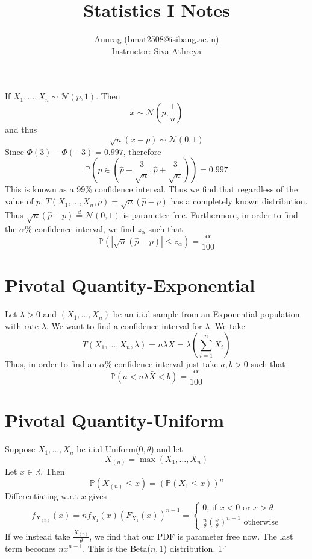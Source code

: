 \documentclass{article}
\title{Statistics I Notes}
\author{
\begin{tabular}{c}
Anurag (bmat2508@isibang.ac.in)\\[0.6em]
Instructor: Siva Athreya
\end{tabular}
}
\date{}
\begin{document}
\maketitle
If $X_1,\dots,X_n \sim \mathcal{N}(p,1)$. Then
$$\bar{x}\sim \mathcal{N}(p,\frac{1}{n})$$
and thus
$$\sqrt{n}(\bar{x}-p)\sim\mathcal{N}(0,1)$$
Since $\Phi(3)-\Phi(-3)=0.997$, therefore
$$\mathbb{P}(p\in(\hat{p}-\frac{3}{\sqrt{n}},\hat{p}+\frac{3}{\sqrt{n}}))=0.997$$
This is known as a 99\% confidence interval.
Thus we find that regardless of the value of $p$, $T(X_1,\dots,X_n,p)=\sqrt{n}(\hat{p}-p)$ has  a completely known distribution.
Thus $\sqrt{n}(\hat{p}-p)\overset{d}{=}\mathcal{N}(0,1)$ is parameter free. Furthermore, in order to find the $\alpha\%$ confidence interval, we find $z_{\alpha}$ such that
$$\mathbb{P}(|\sqrt{n}(\hat{p}-p)|\leq z_{\alpha})=\frac{\alpha}{100}$$
\section*{Pivotal Quantity-Exponential}
Let $\lambda>0$ and $(X_1,\dots,X_n)$ be an i.i.d sample from an Exponential population with rate $\lambda$. We want to find a confidence interval for $\lambda$. We take
$$T(X_1,\dots,X_n,\lambda)=n\lambda\bar{X}=\lambda \left(\sum_{i=1}^n X_i\right)$$
Thus, in order to find an $\alpha\%$ confidence interval just take $a,b>0$ such that 
$$\mathbb{P}(a<n\lambda\bar{X}<b)=\frac{\alpha}{100}$$
\section*{Pivotal Quantity-Uniform}
Suppose $X_1,\dots,X_n$  be i.i.d Uniform($0,\theta$) and let
$$X_{(n)}=\max{(X_1,\dots,X_n)}$$
 Let $x\in\mathbb{R}$. Then $$\mathbb{P}(X_{(n)}\leq x)=(\mathbb{P}(X_1\leq x))^n$$
 Differentiating w.r.t $x$ gives
 $$f_{X_{(n)}}(x)=n f_{X_1}(x)\left(F_{X_1}(x)\right)^{n-1}=
 \begin{cases}
 0\text{, if } x<0 \text{ or }x>\theta\\
 \frac{n}{\theta}\left(\frac{x}{\theta}\right)^{n-1}\text{ otherwise}
 \end{cases}$$
If we instead take $\frac{X_{(n)}}{\theta}$, we find that our PDF is parameter free now. The last term becomes $nx^{n-1}$. This is the Beta($n,1$) distribution.
1`'
\end{document}
